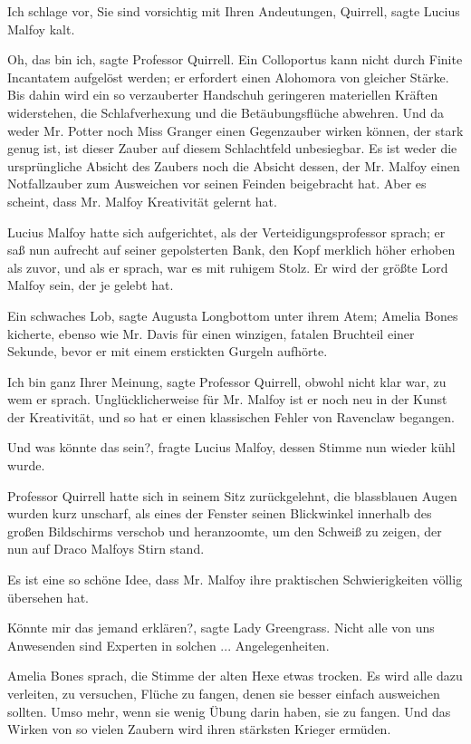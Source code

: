 \glqq{}Ich schlage vor, Sie sind vorsichtig mit Ihren Andeutungen,
Quirrell\grqq{}, sagte Lucius Malfoy kalt.

\glqq{}Oh, das bin ich\grqq{}, sagte Professor Quirrell. \glqq{}Ein Colloportus
kann nicht durch Finite Incantatem aufgelöst werden; er erfordert einen
Alohomora von gleicher Stärke. Bis dahin wird ein so verzauberter Handschuh
geringeren materiellen Kräften widerstehen, die Schlafverhexung und die
Betäubungsflüche abwehren. Und da weder Mr. Potter noch Miss Granger einen
Gegenzauber wirken können, der stark genug ist, ist dieser Zauber auf diesem
Schlachtfeld unbesiegbar. Es ist weder die ursprüngliche Absicht des Zaubers
noch die Absicht dessen, der Mr. Malfoy einen Notfallzauber zum Ausweichen vor
seinen Feinden beigebracht hat. Aber es scheint, dass Mr. Malfoy Kreativität
gelernt hat.\grqq{}

Lucius Malfoy hatte sich aufgerichtet, als der Verteidigungsprofessor sprach; er
saß nun aufrecht auf seiner gepolsterten Bank, den Kopf merklich höher erhoben
als zuvor, und als er sprach, war es mit ruhigem Stolz. \glqq{}Er wird der größte
Lord Malfoy sein, der je gelebt hat.\grqq{}

\glqq{}Ein schwaches Lob\grqq{}, sagte Augusta Longbottom unter ihrem Atem;
Amelia Bones kicherte, ebenso wie Mr. Davis für einen winzigen, fatalen
Bruchteil einer Sekunde, bevor er mit einem erstickten Gurgeln aufhörte.

\glqq{}Ich bin ganz Ihrer Meinung\grqq{}, sagte Professor Quirrell, obwohl nicht
klar war, zu wem er sprach. \glqq{}Unglücklicherweise für Mr. Malfoy ist er noch
neu in der Kunst der Kreativität, und so hat er einen klassischen Fehler von
Ravenclaw begangen.\grqq{}

\glqq{}Und was könnte das sein?\grqq{}, fragte Lucius Malfoy, dessen Stimme nun
wieder kühl wurde.

Professor Quirrell hatte sich in seinem Sitz zurückgelehnt, die blassblauen
Augen wurden kurz unscharf, als eines der Fenster seinen Blickwinkel innerhalb
des großen Bildschirms verschob und heranzoomte, um den Schweiß zu zeigen, der
nun auf Draco Malfoys Stirn stand.

\glqq{}Es ist eine so schöne Idee, dass Mr. Malfoy ihre praktischen
Schwierigkeiten völlig übersehen hat.\grqq{}

\glqq{}Könnte mir das jemand erklären?\grqq{}, sagte Lady Greengrass. \glqq{}Nicht
alle von uns Anwesenden sind Experten in solchen ... Angelegenheiten.\grqq{}

Amelia Bones sprach, die Stimme der alten Hexe etwas trocken. \glqq{}Es wird alle
dazu verleiten, zu versuchen, Flüche zu fangen, denen sie besser einfach
ausweichen sollten. Umso mehr, wenn sie wenig Übung darin haben, sie zu fangen.
Und das Wirken von so vielen Zaubern wird ihren stärksten Krieger
ermüden.\grqq{}

